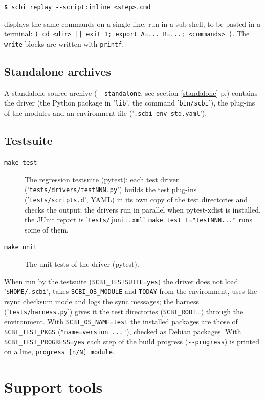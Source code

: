 \documentclass[a4paper,12pt,twoside]{article}
\newcommand{\code}[1]{\texttt{#1}}
\newcommand{\seeref}[1]{see section \ref{#1} p.\pageref{#1}}
\newcommand{\file}[1]{'{\texttt{#1}}'}
\newcommand{\cmd}[1]{\tabto{1cm}\hspace{0.5cm}\texttt{\textbf{\$} #1}}
\let\stdsection\section
\renewcommand\section{\newpage\stdsection}
\newcommand{\ddash}{-{}-}
\begin{document}
\cmd{scbi replay \ddash{}script:inline <step>.cmd}

displays the same commands on a single line, run in a sub-shell, to be
pasted in a terminal: \code{( cd <dir> || exit 1; export A=... B=...;
<commands> )}. The \code{write} blocks are written with \code{printf}.

\subsection{Standalone archives}

A standalone source archive (\code{\ddash{}standalone}, \seeref{standalone})
contains the driver (the Python package in \file{lib}, the command
\file{bin/scbi}), the plug-ins of the modules and an environment file
(\file{.scbi-env-std.yaml}).

\subsection{Testsuite}

\begin{description}
	\item[\code{make test}] The regression testsuite (pytest): each test
	driver (\file{tests/drivers/testNNN.py}) builds the test plug-ins
	(\file{tests/scripts.d}, YAML) in its own copy of the test directories
	and checks the output; the drivers run in parallel when pytest-xdist
	is installed, the JUnit report is \file{tests/junit.xml}.
	\code{make test T="testNNN..."} runs some of them.
	\item[\code{make unit}] The unit tests of the driver (pytest).
\end{description}

When run by the testsuite (\code{SCBI\_TESTSUITE=yes}) the driver does not
load \file{\$HOME/.scbi}, takes \code{SCBI\_OS\_MODULE} and \code{TODAY}
from the environment, uses the rsync checksum mode and logs the sync
messages; the harness (\file{tests/harness.py}) gives it the test
directories (\code{SCBI\_ROOT}\ldots) through the environment. With \code{SCBI\_OS\_NAME=test} the
installed packages are those of \code{SCBI\_TEST\_PKGS} (\code{"name=version
..."}), checked as Debian packages. With \code{SCBI\_TEST\_PROGRESS=yes} each step of the build progress (\code{\ddash{}progress}) is printed on a line, \code{progress [n/N] module}.


\section{Support tools}
\end{document}
